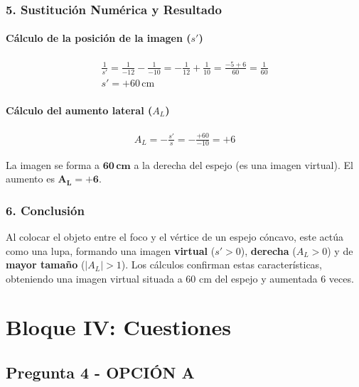 \subsubsection*{5. Sustitución Numérica y Resultado}
\paragraph{Cálculo de la posición de la imagen ($s'$)}
\begin{gather}
    \frac{1}{s'} = \frac{1}{-12} - \frac{1}{-10} = -\frac{1}{12} + \frac{1}{10} = \frac{-5 + 6}{60} = \frac{1}{60} \\
    s' = +60 \, \text{cm}
\end{gather}
\paragraph{Cálculo del aumento lateral ($A_L$)}
\begin{gather}
    A_L = -\frac{s'}{s} = -\frac{+60}{-10} = +6
\end{gather}
\begin{cajaresultado}
    La imagen se forma a $\boldsymbol{60 \, \textbf{cm}}$ a la derecha del espejo (es una imagen virtual). El aumento es $\boldsymbol{A_L = +6}$.
\end{cajaresultado}

\subsubsection*{6. Conclusión}
\begin{cajaconclusion}
Al colocar el objeto entre el foco y el vértice de un espejo cóncavo, este actúa como una lupa, formando una imagen \textbf{virtual} ($s'>0$), \textbf{derecha} ($A_L>0$) y de \textbf{mayor tamaño} ($|A_L|>1$). Los cálculos confirman estas características, obteniendo una imagen virtual situada a 60 cm del espejo y aumentada 6 veces.
\end{cajaconclusion}

\newpage

\section{Bloque IV: Cuestiones}
\label{sec:em_2008_sep_ext}

\subsection{Pregunta 4 - OPCIÓN A}
\label{subsec:4A_2008_sep_ext}

